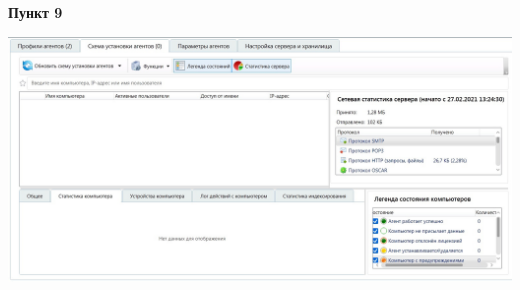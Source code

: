 \documentclass[a4paper,14pt]{extarticle}
\begin{document}
    \textbf{Пункт 9} \\
    \begin{center}
        \includegraphics[scale=0.25]{pics/9.jpg}
    \end{center}
\end{document}
